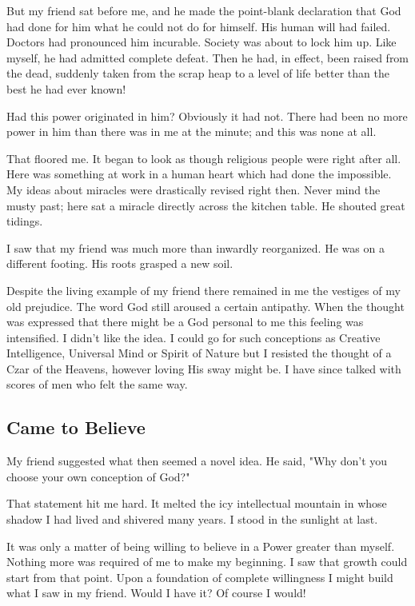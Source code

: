 But my friend sat before me, and he made the point-blank declaration that God had done for him what he could not do for himself.
His human will had failed.
Doctors had pronounced him incurable.
Society was about to lock him up.
Like myself, he had admitted complete defeat.
Then he had, in effect, been raised from the dead, suddenly taken from the scrap heap to a level of life better than the best he had ever known!

Had this power originated in him?
Obviously it had not.
There had been no more power in him than there was in me at the minute; and this was none at all.

That floored me.
It began to look as though religious people were right after all.
Here was something at work in a human heart which had done the impossible.
My ideas about miracles were drastically revised right then.
Never mind the musty past; here sat a miracle directly across the kitchen table.
He shouted great tidings.

I saw that my friend was much more than inwardly reorganized.
He was on a different footing.
His roots grasped a new soil.

Despite the living example of my friend there remained in me the vestiges of my old prejudice.
The word God still aroused a certain antipathy.
When the thought was expressed that there might be a God personal to me this feeling was intensified.
I didn't like the idea.
I could go for such conceptions as Creative Intelligence, Universal Mind or Spirit of Nature but I resisted the thought of a Czar of the Heavens, however loving His sway might be.
I have since talked with scores of men who felt the same way.


\subsection{Came to Believe}

My friend suggested what then seemed a novel idea.  He said, "Why don't you choose your own conception of God?"

That statement hit me hard.
It melted the icy intellectual mountain in whose shadow I had lived and shivered many years.
I stood in the sunlight at last.

It was only a matter of being willing to believe in a Power greater than myself.
Nothing more was required of me to make my beginning.
I saw that growth could start from that point.
Upon a foundation of complete willingness I might build what I saw in my friend.
Would I have it?
Of course I would!

